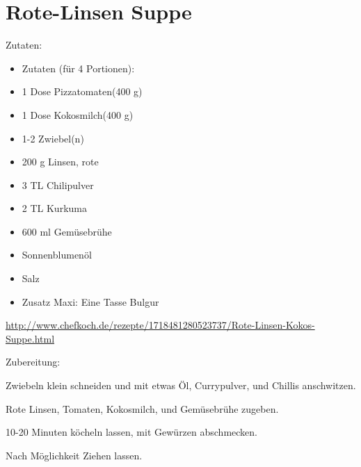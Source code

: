 \section{Rote-Linsen Suppe}
Zutaten:
\begin{itemize}
	\item Zutaten (für 4 Portionen):
	\item 1 Dose	Pizzatomaten(400 g)
	\item 1 Dose	Kokosmilch(400 g)
	\item 1-2 Zwiebel(n)
	\item 200 g	Linsen, rote
	\item 3 TL	Chilipulver
	\item 2 TL	Kurkuma
	\item 600 ml	Gemüsebrühe
	\item Sonnenblumenöl
	\item Salz
	\item Zusatz Maxi: Eine Tasse Bulgur
\end{itemize}

\url{http://www.chefkoch.de/rezepte/1718481280523737/Rote-Linsen-Kokos-Suppe.html}

\noindent Zubereitung:

Zwiebeln klein schneiden und mit etwas Öl, Currypulver, und Chillis anschwitzen.

Rote Linsen, Tomaten, Kokosmilch, und Gemüsebrühe zugeben.

10-20 Minuten köcheln lassen, mit Gewürzen abschmecken.

Nach Möglichkeit Ziehen lassen.

\noindent
\mbox{}
\vfill
\begin{center}
\end{center}
\vfill
\mbox{ }
\newpage
